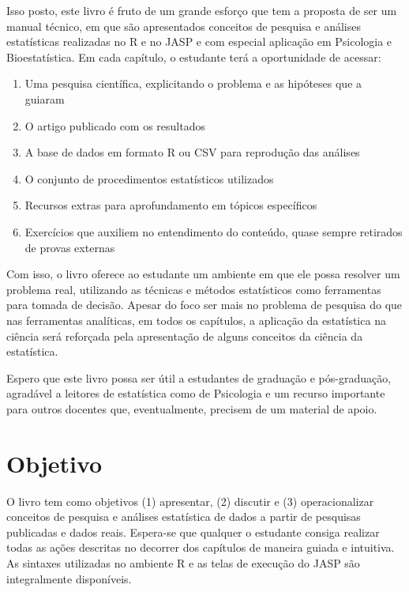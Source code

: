 \documentclass[
]{book}
\providecommand{\tightlist}{%
  \setlength{\itemsep}{0pt}\setlength{\parskip}{0pt}}
\begin{document}
Isso posto, este livro é fruto de um grande esforço que tem a proposta
de ser um manual técnico, em que são apresentados conceitos de pesquisa
e análises estatísticas realizadas no R e no JASP e com especial
aplicação em Psicologia e Bioestatística. Em cada capítulo, o estudante
terá a oportunidade de acessar:

\begin{enumerate}
\def\labelenumi{\arabic{enumi}.}
\tightlist
\item
  Uma pesquisa científica, explicitando o problema e as hipóteses que a
  guiaram\\
\item
  O artigo publicado com os resultados\\
\item
  A base de dados em formato R ou CSV para reprodução das análises\\
\item
  O conjunto de procedimentos estatísticos utilizados\\
\item
  Recursos extras para aprofundamento em tópicos específicos\\
\item
  Exercícios que auxiliem no entendimento do conteúdo, quase sempre
  retirados de provas externas
\end{enumerate}

Com isso, o livro oferece ao estudante um ambiente em que ele possa
resolver um problema real, utilizando as técnicas e métodos estatísticos
como ferramentas para tomada de decisão. Apesar do foco ser mais no
problema de pesquisa do que nas ferramentas analíticas, em todos os
capítulos, a aplicação da estatística na ciência será reforçada pela
apresentação de alguns conceitos da ciência da estatística.

Espero que este livro possa ser útil a estudantes de graduação e
pós-graduação, agradável a leitores de estatística como de Psicologia e
um recurso importante para outros docentes que, eventualmente, precisem
de um material de apoio.

\hypertarget{objetivo}{%
\section{Objetivo}\label{objetivo}}

O livro tem como objetivos (1) apresentar, (2) discutir e (3)
operacionalizar conceitos de pesquisa e análises estatística de dados a
partir de pesquisas publicadas e dados reais. Espera-se que qualquer o
estudante consiga realizar todas as ações descritas no decorrer dos
capítulos de maneira guiada e intuitiva. As sintaxes utilizadas no
ambiente R e as telas de execução do JASP são integralmente disponíveis.
\end{document}
